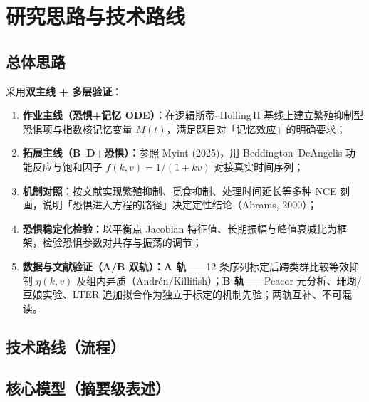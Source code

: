 \documentclass[12pt,a4paper]{ctexart}
\begin{document}
\section{研究思路与技术路线}

\subsection{总体思路}

采用\textbf{双主线 + 多层验证}：

\begin{enumerate}[label=\textbf{(\arabic*)}]
  \item \textbf{作业主线（恐惧+记忆 ODE）：}在逻辑斯蒂--Holling\,II 基线上建立繁殖抑制型恐惧项与指数核记忆变量 $M(t)$，满足题目对「记忆效应」的明确要求；
  \item \textbf{拓展主线（B--D+恐惧）：}参照 Myint (2025)，用 Beddington--DeAngelis 功能反应与饱和因子 $f(k,v)=1/(1+kv)$ 对接真实时间序列；
  \item \textbf{机制对照：}按文献实现繁殖抑制、觅食抑制、处理时间延长等多种 NCE 刻画，说明「恐惧进入方程的路径」决定定性结论（Abrams, 2000）；
  \item \textbf{恐惧稳定化检验：}以平衡点 Jacobian 特征值、长期振幅与峰值衰减比为框架，检验恐惧参数对共存与振荡的调节；
  \item \textbf{数据与文献验证（A/B 双轨）：}\textbf{A 轨}——12 条序列标定后跨类群比较等效抑制 $\eta(k,v)$ 及组内异质（Andrén/Killifish）；\textbf{B 轨}——Peacor 元分析、珊瑚/豆娘实验、LTER 追加拟合作为独立于标定的机制先验；两轨互补、不可混读。
\end{enumerate}

\subsection{技术路线（流程）}

\begin{center}
\end{center}

\subsection{核心模型（摘要级表述）}
\end{document}

